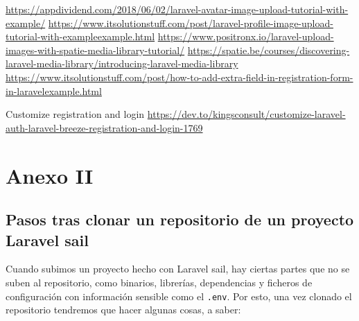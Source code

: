 \documentclass[11pt]{article}
\begin{document}
\url{https://appdividend.com/2018/06/02/laravel-avatar-image-upload-tutorial-with-example/}
\url{https://www.itsolutionstuff.com/post/laravel-profile-image-upload-tutorial-with-exampleexample.html}
\url{https://www.positronx.io/laravel-upload-images-with-spatie-media-library-tutorial/}
\url{https://spatie.be/courses/discovering-laravel-media-library/introducing-laravel-media-library}
\url{https://www.itsolutionstuff.com/post/how-to-add-extra-field-in-registration-form-in-laravelexample.html}

Customize registration and login
\url{https://dev.to/kingsconsult/customize-laravel-auth-laravel-breeze-registration-and-login-1769}


\newpage


\section{Anexo II}
\label{sec:orgeea75ab}
\subsection{Pasos tras clonar un repositorio de un proyecto Laravel sail}
\label{sec:orgd081932}
Cuando subimos un proyecto hecho con Laravel sail, hay ciertas partes
que no se suben al repositorio, como binarios, librerías, dependencias
y ficheros de configuración con información sensible como el
\texttt{.env}. Por esto, una vez clonado el repositorio tendremos que hacer
algunas cosas, a saber:
\end{document}
